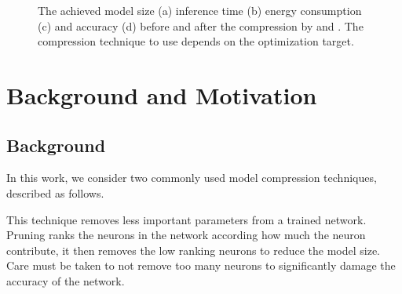 \begin{figure}[!t]
\centering
{}
\hfill
{}
\hfill
{}
\hfill
{}
\hfill
\caption{The achieved model size (a) inference time (b) energy consumption (c) and accuracy (d) before and after the compression by \quantization and \pruning.
The compression technique to use depends on the optimization target.}
\label{fig:motivation}
\end{figure}

\section{Background and Motivation}
\subsection{Background}
In this work, we consider two commonly used model compression techniques, described as follows.

 This technique removes less important parameters from a trained network. Pruning ranks the neurons in the network
according how much the neuron contribute, it then removes the low ranking neurons to reduce the model size. Care must be taken to not
remove too many neurons to significantly damage the accuracy of the network.

